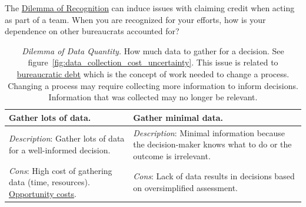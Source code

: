 The \hyperref[table:dilemma-personal-recognition-obscurity]{Dilemma of Recognition} can induce issues with claiming credit when acting as part of a team. When you are recognized for your efforts, how is your dependence on other bureaucrats accounted for?



\begin{center}
\begin{table}[H] %
\begin{tabular}{ | m{\dilemmatablewidth}| m{\dilemmatablewidth} | } 
  \hline
  \textbf{Gather lots of data.} &
  \textbf{Gather minimal data.} \\
  \hline
  \textit{Description}: Gather lots of data for a well-informed decision. &
  \textit{Description}: Minimal information because the decision-maker knows what to do or the outcome is irrelevant.  \\  
  \hline
  \textit{Cons}: High cost of gathering data (time, resources). \href{https://en.wikipedia.org/wiki/Opportunity_cost}{Opportunity costs}.
  \index{Wikipedia!opportunity cost@\href{https://en.wikipedia.org/wiki/Opportunity_cost}{opportunity cost}}
  & 
  \textit{Cons}: Lack of data results in decisions based on oversimplified assessment. \\
  \hline
\end{tabular}
\caption{
\textit{Dilemma of Data Quantity.}
How much data to gather for a decision. See figure~\ref{fig:data_collection_cost_uncertainty}. This issue is related to  
\hyperref[sec:bureaucratic-debt]{bureaucratic debt}\iftoggle{haspagenumbers}{ (see  page~\pageref{sec:bureaucratic-debt}),}{,} which is the concept of work needed to change a process. Changing a process may require collecting more information to inform decisions. Information that was collected may no longer be relevant. 
}
\label{table:dilemma-personal-gather-data-lots-vs-little}
\end{table}
\end{center}


